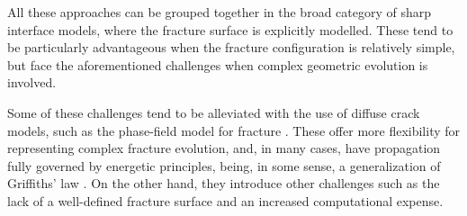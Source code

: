     All these approaches can be grouped together in the broad category of sharp interface models, where the fracture surface is explicitly modelled. These tend to be particularly advantageous when the fracture configuration is relatively simple, but face the aforementioned challenges when complex geometric evolution is involved. 
    
    Some of these challenges tend to be alleviated with the use of diffuse crack models, such as the phase-field model for fracture \cite{francfort1998revisiting, bourdin2000numerical, karma2001phase}. These offer more flexibility for representing complex fracture evolution, and, in many cases, have propagation fully governed by energetic principles, being, in some sense, a generalization of Griffiths' law \cite{griffith1921vi}. On the other hand, they introduce other challenges such as the lack of a well-defined fracture surface and an increased computational expense\cite{heider2021review}.  






